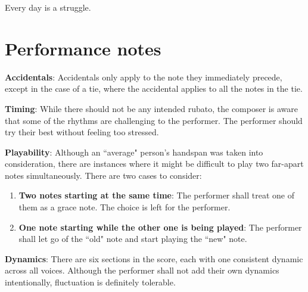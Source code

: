 \documentclass{article}
\begin{document}
Every day is a struggle.
\clearpage
\section*{Performance notes}
{\bfseries Accidentals}: Accidentals only apply to the note they
immediately precede, except in the case of a tie, where the accidental
applies to all the notes in the tie.

{\bfseries Timing}: While there should not be any intended rubato, the
composer is aware that some of the rhythms are challenging to the
performer. The performer should try their best without feeling too
stressed.

{\bfseries Playability}: Although an ``average" person's handspan was
taken into consideration, there are instances where it might be
difficult to play two far-apart notes simultaneously. There are two
cases to consider:
\begin{enumerate}
\item {\bfseries Two notes starting at the same time}: The performer
shall treat one of them as a grace note. The choice is left for the
performer.
\item {\bfseries One note starting while the other one is being played}:
The performer shall let go of the ``old" note and start playing the
``new" note.
\end{enumerate}

{\bfseries Dynamics}: There are six sections in the score, each with one
consistent dynamic across all voices. Although the performer shall not
add their own dynamics intentionally, fluctuation is definitely
tolerable.
\end{document}
